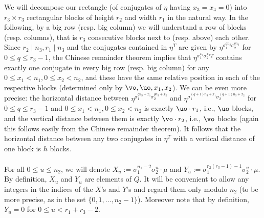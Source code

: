 We will decompose our rectangle (of conjugates of $\eta$ having $x_3=x_4=0$) into $r_3\times r_3$ rectangular blocks of height $r_2$ and width $r_1$ in the natural way. In the following, by a big row (resp. big column) we will understand a row of blocks (resp. columns), that is $r_3$ consecutive blocks next to (resp. above) each other. Since $r_2\mid n_3, r_1\mid n_3$ and the conjugates contained in $\eta^T$ are given by $\eta^{\sigma_1^{qn_3}\sigma_2^{qn_3}}$ for $0\leq q \leq r_3-1$, the Chinese remainder theorem implies that $\eta^{\sigma_1^{x_1}\sigma_2^{x_2}T}$ contains exactly one conjugate in every big row (resp. big column) for any $0\leq x_1< n_1, 0\leq x_2< n_2$, and these have the same relative position in each of the respective blocks (determined only by $\vo,\uo,x_1,x_2$). We can be even more precise: the horizontal distance between $\eta^{\sigma_1^{qn_3+x_1}\sigma_2^{qn_3+x_2}}$ and $\eta^ {\sigma_1^{(q+1)n_3+x_1}\sigma_2^{(q+1)n_3+x_2}}$ for $0\leq q \leq r_3-1$ and $0\leq x_1< n_1, 0\leq x_2< n_2$ is exactly $\uo\cdot r_1$, i.e., $\uo$ blocks, and the vertical distance between them is exactly $\vo\cdot r_2$, i.e., $\vo$ blocks (again this follows easily from the Chinese remainder theorem). It follows that the horizontal distance between any two conjugates in $\eta^T$ with a vertical distance of one block is $h$ blocks.

\paragraph*{}
For all $0\leq u\leq n_2$, we will denote $X_u:=\sigma_1^{n_1-2}\sigma_2^{u}\cdot \mu$ and $Y_u:=\sigma_1^{r_2(r_3-1)-1}\sigma_2^u\cdot \mu$. By definition, $X_u$ and $Y_u$ are elements of $Q$. It will be convenient to allow any integers in the indices of the $X$'s and $Y$'s and regard them only modulo $n_2$ (to be more precise, as in the set $\{0,1,\dots,n_2-1\}$). Moreover note that by definition, $Y_u=0$ for $0\leq u< r_1+r_3-2$. 


